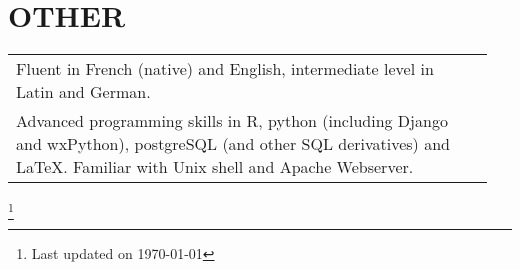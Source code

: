 \documentclass[11pt, a4paper]{article}
\begin{document}
\section{OTHER}
\begin{longtable}{P{0.94\linewidth} p{0.01\linewidth}}
Fluent in French (native) and English, intermediate level in Latin and German. & \\
Advanced programming skills in R, python (including Django and wxPython), postgreSQL (and other SQL derivatives) and \LaTeX. Familiar with Unix shell and Apache Webserver. & \\
\end{longtable}

{\let\thefootnote\relax\footnote{Last updated on \today}}
\end{document}
